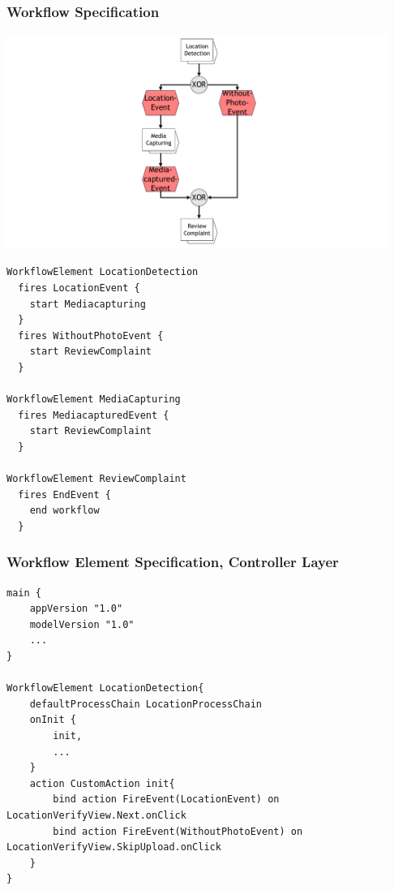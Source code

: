 
\begin{frame}
	\plainnumber
	\frametitle{Workflow Specification}
	
	\begin{minipage}{0.45\textwidth}
	    		        \includegraphics[height = 7cm, trim = 10cm 0cm 10cm 0cm, clip = true]{images/WorkflowSpecification.pdf}	  
	\end{minipage}\hfill
	\begin{minipage}{0.5\textwidth}
\begin{lstlisting}
WorkflowElement LocationDetection
  fires LocationEvent {
    start Mediacapturing
  }
  fires WithoutPhotoEvent {
    start ReviewComplaint
  }

WorkflowElement MediaCapturing
  fires MediacapturedEvent {
    start ReviewComplaint
  }

WorkflowElement ReviewComplaint
  fires EndEvent {
    end workflow
  }
\end{lstlisting}
\end{minipage}

\end{frame}

\begin{frame}[fragile]
 \frametitle{Workflow Element Specification, Controller Layer}
 
\begin{lstlisting}
main {
	appVersion "1.0" 
	modelVersion "1.0"
	...
}

WorkflowElement LocationDetection{
	defaultProcessChain LocationProcessChain
	onInit {
		init,
		...
	}	
	action CustomAction init{
		bind action FireEvent(LocationEvent) on LocationVerifyView.Next.onClick
		bind action FireEvent(WithoutPhotoEvent) on LocationVerifyView.SkipUpload.onClick
	}
}
\end{lstlisting}
\end{frame}

